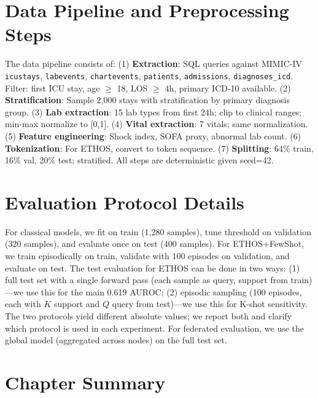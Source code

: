 \section{Data Pipeline and Preprocessing Steps}

The data pipeline consists of: (1) \textbf{Extraction}: SQL queries against MIMIC-IV \texttt{icustays}, \texttt{labevents}, \texttt{chartevents}, \texttt{patients}, \texttt{admissions}, \texttt{diagnoses\_icd}. Filter: first ICU stay, age $\geq$ 18, LOS $\geq$ 4h, primary ICD-10 available. (2) \textbf{Stratification}: Sample 2,000 stays with stratification by primary diagnosis group. (3) \textbf{Lab extraction}: 15 lab types from first 24h; clip to clinical ranges; min-max normalize to [0,1]. (4) \textbf{Vital extraction}: 7 vitals; same normalization. (5) \textbf{Feature engineering}: Shock index, SOFA proxy, abnormal lab count. (6) \textbf{Tokenization}: For ETHOS, convert to token sequence. (7) \textbf{Splitting}: 64\% train, 16\% val, 20\% test; stratified. All steps are deterministic given seed=42.

\section{Evaluation Protocol Details}

For classical models, we fit on train (1,280 samples), tune threshold on validation (320 samples), and evaluate once on test (400 samples). For ETHOS+FewShot, we train episodically on train, validate with 100 episodes on validation, and evaluate on test. The test evaluation for ETHOS can be done in two ways: (1) full test set with a single forward pass (each sample as query, support from train)---we use this for the main 0.619 AUROC; (2) episodic sampling (100 episodes, each with $K$ support and $Q$ query from test)---we use this for K-shot sensitivity. The two protocols yield different absolute values; we report both and clarify which protocol is used in each experiment. For federated evaluation, we use the global model (aggregated across nodes) on the full test set.

\section{Chapter Summary}


